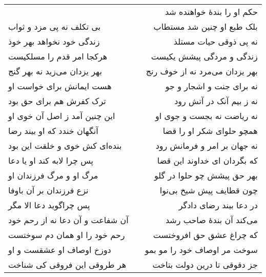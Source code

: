 \begin{center}
\begin{longtable}{l p{0.5cm} r}
&&
حکم او را بندهٔ خواهنده شد
\\
بی تکلف نه پی مزد و ثواب
&&
بلک طبع او چنین شد مستطاب
\\
زندگی خود نخواهد بهر خوذ
&&
نه پی ذوقی حیات مستلذ
\\
هرکجا امر قدم را مسلکیست
&&
زندگی و مردگی پیشش یکیست
\\
بهر یزدان می‌زید نه بهر گنج
&&
بهر یزدان می‌مرد نه از خوف رنج
\\
هست ایمانش برای خواست او
&&
نه برای جنت و اشجار و جو
\\
ترک کفرش هم برای حق بود
&&
نه ز بیم آنک در آتش رود
\\
این چنین آمد ز اصل آن خوی او
&&
نه ریاضت نه بجست و جوی او
\\
آنگهان خندد که او بیند رضا
&&
همچو حلوای شکر او را قضا
\\
بنده‌ای کش خوی و خلقت این بود
&&
نه جهان بر امر و فرمانش رود
\\
پس چرا لابه کند او یا دعا
&&
که بگردان ای خداوند این قضا
\\
مرگ او و مرگ فرزندان او
&&
بهر حق پیشش چو حلوا در گلو
\\
نزع فرزندان بر آن باوفا
&&
چون قطایف پیش شیخ بی‌نوا
\\
پس چراگوید دعا الا مگر
&&
در دعا بیند رضای دادگر
\\
آن شفاعت و آن دعا نه از رحم خود
&&
می‌کند آن بندهٔ صاحب رشد
\\
رحم خود را او همان دم سوختست
&&
که چراغ عشق حق افروختست
\\
دوزخ اوصاف او عشقست و او
&&
سوخت مر اوصاف خود را مو بمو
\\
هر طروقی این فروقی کی شناخت
&&
جز دقوقی تا درین دولت بتاخت
\\
\end{longtable}
\end{center}
